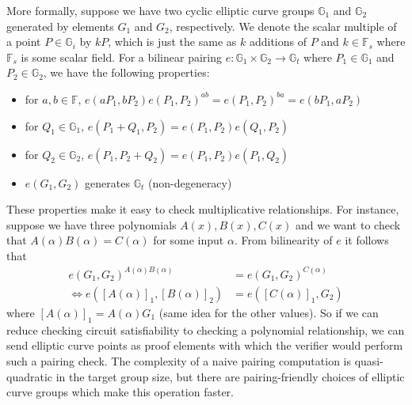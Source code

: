 \noindent More formally, suppose we have two cyclic elliptic curve groups $\mathbb{G}_1$ and $\mathbb{G}_2$ generated by elements $G_1$ and $G_2$, respectively. We denote the scalar multiple of a point $P \in \mathbb{G}_i$ by $kP$, which is just the same as $k$ additions of $P$ and $k \in \mathbb{F}_s$ where $\mathbb{F}_s$ is some scalar field. For a bilinear pairing $e: \mathbb{G}_1 \times \mathbb{G}_2 \to \mathbb{G}_t$ where $P_1 \in \mathbb{G}_1$ and $P_2 \in \mathbb{G}_2$, we have the following properties:
\begin{itemize}
    \item for $a, b \in \mathbb{F}$, $e(aP_1, bP_2) e(P_1, P_2)^{ab} = e(P_1, P_2)^{ba} = e(bP_1, aP_2)$
    \item for $Q_1 \in \mathbb{G}_1$, $e(P_1+Q_1, P_2) = e(P_1, P_2) e(Q_1, P_2)$
    \item for $Q_2 \in \mathbb{G}_2$, $e(P_1, P_2+Q_2) = e(P_1, P_2) e(P_1, Q_2)$
    \item $e(G_1, G_2)$ generates $\mathbb{G}_t$ (non-degeneracy)
\end{itemize}

These properties make it easy to check multiplicative relationships. For instance, suppose we have three polynomials $A(x), B(x), C(x)$ and we want to check that $A(\alpha)B(\alpha) = C(\alpha)$ for some input $\alpha$. From bilinearity of $e$ it follows that 
\begin{align*}
e(G_1, G_2)^{A(\alpha)B(\alpha)} &= e(G_1, G_2)^{C(\alpha)} \\
\Leftrightarrow e([A(\alpha)]_1, [B(\alpha)]_2) &= e([C(\alpha)]_1, G_2)
\end{align*}
where $[A(\alpha)]_1 = A(\alpha)G_1$ (same idea for the other values). So if we can reduce checking circuit satisfiability to checking a polynomial relationship, we can send elliptic curve points as proof elements with which the verifier would perform such a pairing check. The complexity of a naive pairing computation is quasi-quadratic in the target group size, but there are pairing-friendly choices of elliptic curve groups which make this operation faster. 

